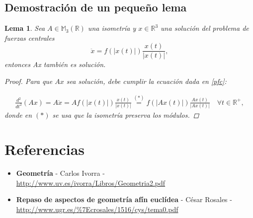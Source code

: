 \documentclass[11pt]{article}
\newtheorem{lema}{Lema}[section]
\theoremstyle{definition}
\begin{document}
    \subsection {Demostración de un pequeño lema}
    \begin{lema} Sea $A \in \mathbb{M}_{3} \left( \mathbb{R} \right)$ una isometría y  $x\in \mathbb{R}^3$ una solución del problema de fuerzas centrales \begin{equation}\ddot{x}=f(|x(t)|)\frac{x(t)}{|x(t)|}, \label{pfc}\end{equation} entonces Ax también es solución.
    \begin{proof}
    Para que $Ax$ sea solución, debe cumplir la ecuación dada en \ref{pfc}:
    
    \begin{align*}
	\frac{d^2}{dt^2}\left( Ax \right)=A\ddot{x}=Af(|x(t)|)\frac{x(t)}{|x(t)|}\stackrel{(*)}{=}f(|Ax(t)|)\frac{Ax(t)}{|Ax(t)|} \quad \forall t\in \mathbb{R}^{+},
    \end{align*}
    donde en $(*)$ se usa que la isometría preserva los módulos.
    
    \end{proof}
\end{lema}

\section{Referencias}

\begin{itemize}
\item\textbf{Geometría} - Carlos Ivorra - \url{http://www.uv.es/ivorra/Libros/Geometria2.pdf}
\item\textbf{Repaso de aspectos de geometría afín euclídea} - César Rosales - \url{http://www.ugr.es/%7Ecrosales/1516/cys/tema0.pdf}
\end{itemize}
\end{document}
